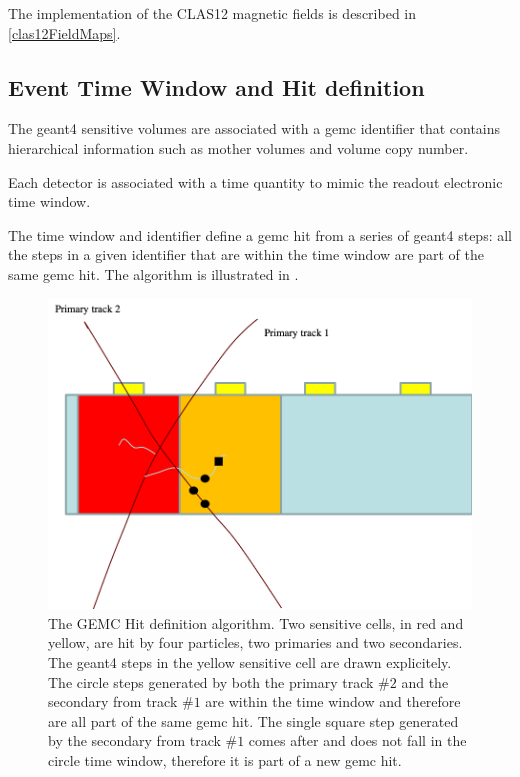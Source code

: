 The implementation of the CLAS12 magnetic fields is described in \ref{clas12FieldMaps}.

\subsection{Event Time Window and Hit definition}
The geant4 sensitive volumes are associated with a gemc identifier that contains hierarchical information such as mother volumes
and volume copy number.

Each detector is associated with a time quantity to mimic the readout electronic time window.

The time window and identifier define a gemc hit from a series of geant4 steps: all the steps in a given identifier that are within the time window
are part of the same gemc hit. The algorithm is illustrated in .

\begin{figure}
	\centering
	\includegraphics[width=0.95\columnwidth,keepaspectratio]{img/hitDefinition.png}
	\caption{The GEMC Hit definition algorithm. Two sensitive cells, in red and yellow, are hit by four particles, two primaries and two secondaries.
             The geant4 steps in the yellow sensitive cell are drawn explicitely. The circle steps generated by both the primary track $\#2$ and the secondary
             from track $\#1$ are within the time window and therefore are all part of the same gemc hit. The single square step generated by the secondary
             from track $\#1$ comes after and does not fall in the circle time window, therefore it is part of a new gemc hit.}
	\label{fig:hitDefinition}
\end{figure}

